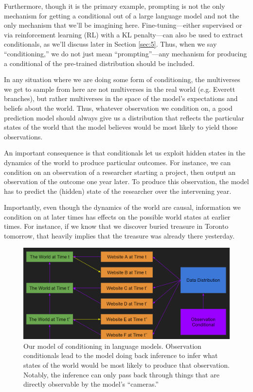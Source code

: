 \documentclass[
  onecolumn,
  natbib,
]{miri-tech-article}
\begin{document}
Furthermore, though it is the primary example, prompting is not the only mechanism for getting a conditional out of a large language model and not the only mechanism that we'll be imagining here. Fine-tuning---either supervised or via reinforcement learning (RL) with a KL penalty\cite{kl_penalty}---can also be used to extract conditionals, as we'll discuss later in Section \ref{sec:5}. Thus, when we say ``conditioning,'' we do not just mean ``prompting''---any mechanism for producing a conditional of the pre-trained distribution should be included.

In any situation where we are doing some form of conditioning, the multiverses we get to sample from here are not multiverses in the real world (e.g. Everett branches\cite{multiple_worlds}), but rather multiverses in the space of the model's expectations and beliefs about the world. Thus, whatever observation we condition on, a good prediction model should always give us a distribution that reflects the particular states of the world that the model believes would be most likely to yield those observations.

An important consequence is that conditionals let us exploit hidden states in the dynamics of the world to produce particular outcomes. For instance, we can condition on an observation of a researcher starting a project, then output an observation of the outcome one year later. To produce this observation, the model has to predict the (hidden) state of the researcher over the intervening year.

Importantly, even though the dynamics of the world are causal, information we condition on at later times has effects on the possible world states at earlier times. For instance, if we know that we discover buried treasure in Toronto tomorrow, that heavily implies that the treasure was already there yesterday.

\begin{figure}[h!]
  \centering
  \includegraphics[width=\textwidth]{FHhZzMg.png}
  \caption{Our model of conditioning in language models. Observation conditionals lead to the model doing back inference to infer what states of the world would be most likely to produce that observation. Notably, the inference can only pass back through things that are directly observable by the model's ``cameras.''}
\end{figure}
\end{document}
